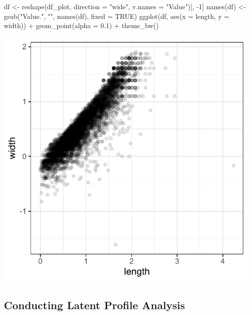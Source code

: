 \documentclass[
  man,floatsintext]{apa6}
\newenvironment{Shaded}{\begin{snugshade}}{\end{snugshade}}
\newcommand{\AttributeTok}[1]{\textcolor[rgb]{0.77,0.63,0.00}{#1}}
\newcommand{\ConstantTok}[1]{\textcolor[rgb]{0.00,0.00,0.00}{#1}}
\newcommand{\DecValTok}[1]{\textcolor[rgb]{0.00,0.00,0.81}{#1}}
\newcommand{\FloatTok}[1]{\textcolor[rgb]{0.00,0.00,0.81}{#1}}
\newcommand{\FunctionTok}[1]{\textcolor[rgb]{0.00,0.00,0.00}{#1}}
\newcommand{\NormalTok}[1]{#1}
\newcommand{\OtherTok}[1]{\textcolor[rgb]{0.56,0.35,0.01}{#1}}
\newcommand{\SpecialCharTok}[1]{\textcolor[rgb]{0.00,0.00,0.00}{#1}}
\newcommand{\StringTok}[1]{\textcolor[rgb]{0.31,0.60,0.02}{#1}}
\begin{document}
\begin{Shaded}
\begin{Highlighting}[]
\NormalTok{df }\OtherTok{\textless{}{-}} \FunctionTok{reshape}\NormalTok{(df\_plot, }\AttributeTok{direction =} \StringTok{"wide"}\NormalTok{, }\AttributeTok{v.names =} \StringTok{"Value"}\NormalTok{)[,}
    \SpecialCharTok{{-}}\DecValTok{1}\NormalTok{]}
\FunctionTok{names}\NormalTok{(df) }\OtherTok{\textless{}{-}} \FunctionTok{gsub}\NormalTok{(}\StringTok{"Value."}\NormalTok{, }\StringTok{""}\NormalTok{, }\FunctionTok{names}\NormalTok{(df), }\AttributeTok{fixed =} \ConstantTok{TRUE}\NormalTok{)}
\FunctionTok{ggplot}\NormalTok{(df, }\FunctionTok{aes}\NormalTok{(}\AttributeTok{x =}\NormalTok{ length, }\AttributeTok{y =}\NormalTok{ width)) }\SpecialCharTok{+} \FunctionTok{geom\_point}\NormalTok{(}\AttributeTok{alpha =} \FloatTok{0.1}\NormalTok{) }\SpecialCharTok{+}
    \FunctionTok{theme\_bw}\NormalTok{()}
\end{Highlighting}
\end{Shaded}

\includegraphics{appendices/plot_gmm_scatter.pdf}

\hypertarget{conducting-latent-profile-analysis}{%
\subsection{Conducting Latent Profile Analysis}\label{conducting-latent-profile-analysis}}
\end{document}
